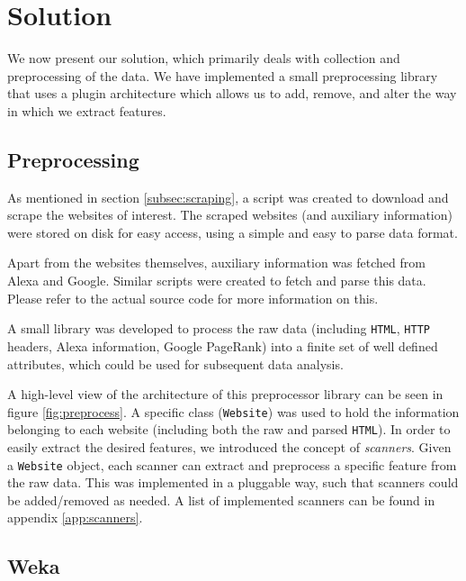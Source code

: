 \section{Solution}
\label{sec:solution}

We now present our solution, which primarily deals with collection and preprocessing of the data. We have implemented a small preprocessing library that uses a plugin architecture which allows us to add, remove, and alter the way in which we extract features.

\subsection{Preprocessing}
\label{subsec:preprocessing}


As mentioned in section \ref{subsec:scraping}, a script was created to download and scrape the websites of interest. The scraped websites (and auxiliary information) were stored on disk for easy access, using a simple and easy to parse data format.

Apart from the websites themselves, auxiliary information was fetched from Alexa and Google. Similar scripts were created to fetch and parse this data. Please refer to the actual source code for more information on this.

A small library was developed to process the raw data (including \texttt{HTML}, \texttt{HTTP} headers, Alexa information, Google PageRank) into a finite set of well defined attributes, which could be used for subsequent data analysis.

A high-level view of the architecture of this preprocessor library can be seen in figure \ref{fig:preprocess}. A specific class (\texttt{Website}) was used to hold the information belonging to each website (including both the raw and parsed \texttt{HTML}). In order to easily extract the desired features, we introduced the concept of \textit{scanners}. Given a \texttt{Website} object, each scanner can extract and preprocess a specific feature from the raw data. This was implemented in a pluggable way, such that scanners could be added/removed as needed. A list of implemented scanners can be found in appendix \ref{app:scanners}.


\subsection{Weka}
\label{subsec:weka}

